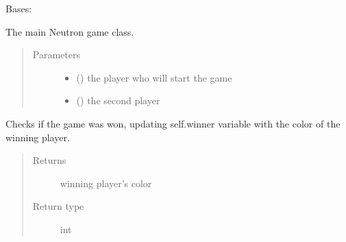 \documentclass[letterpaper,10pt,english]{sphinxmanual}
\begin{document}
\begin{fulllineitems}
\label{\detokenize{neutron:neutron.NeutronGame}}
Bases: 

The main Neutron game class.
\begin{quote}\begin{description}
\item[{Parameters}] \leavevmode\begin{itemize}
\item {} 
 ({\hyperref[\detokenize{player:player.Player}]{}}) \textendash{} the player who will start the game

\item {} 
 ({\hyperref[\detokenize{player:player.Player}]{}}) \textendash{} the second player

\end{itemize}

\end{description}\end{quote}

\begin{fulllineitems}
\label{\detokenize{neutron:neutron.NeutronGame.check_won}}
Checks if the game was won, updating self.winner variable with the
color of the winning player.
\begin{quote}\begin{description}
\item[{Returns}] \leavevmode
winning player’s color

\item[{Return type}] \leavevmode
int

\end{description}\end{quote}

\end{fulllineitems}



\end{fulllineitems}
\end{document}
